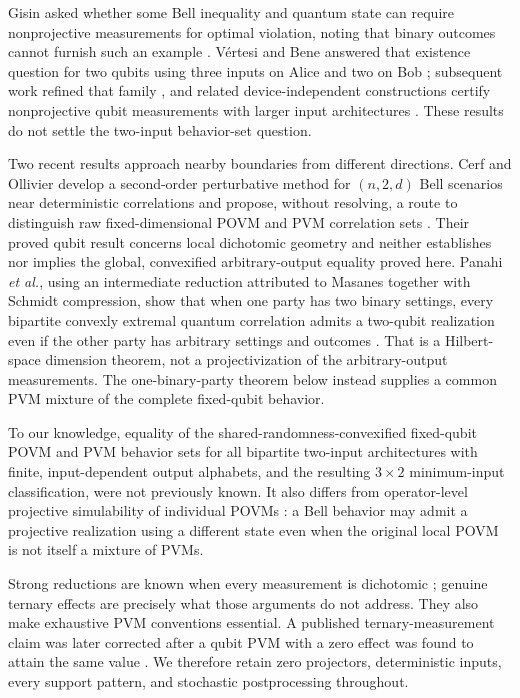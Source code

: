 \documentclass[11pt]{article}
\theoremstyle{definition}
\begin{document}
Gisin asked whether some Bell inequality and quantum state can require
nonprojective measurements for optimal violation, noting that binary outcomes
cannot furnish such an example \cite{gisin2007}. V\'ertesi and Bene answered
that existence question for two qubits using three inputs on Alice and two on Bob
\cite{vertesi2010}; subsequent work refined that family
\cite{barra2012}, and related device-independent constructions certify
nonprojective qubit measurements with larger input architectures
\cite{gomez2016}. These results do not settle the two-input behavior-set
question.

Two recent results approach nearby boundaries from different directions.
Cerf and Ollivier develop a second-order perturbative method for
\((n,2,d)\) Bell scenarios near deterministic correlations and propose,
without resolving, a route to distinguish raw fixed-dimensional POVM and PVM
correlation sets \cite{cerf2026}. Their proved qubit result concerns local
dichotomic geometry and neither establishes nor implies the global,
convexified arbitrary-output equality proved here. Panahi \emph{et al.},
using an intermediate reduction attributed to Masanes together with Schmidt
compression, show that when one party has two binary settings, every
bipartite convexly extremal quantum correlation admits a two-qubit
realization even if the other party has arbitrary settings and outcomes
\cite{panahi2025}. That is a Hilbert-space dimension theorem, not a
projectivization of the arbitrary-output measurements. The
one-binary-party theorem below instead supplies a common PVM mixture of the
complete fixed-qubit behavior.

To our knowledge, equality of the shared-randomness-convexified fixed-qubit
POVM and PVM behavior sets for all bipartite two-input architectures with
finite, input-dependent output alphabets, and the resulting \(3\times2\)
minimum-input classification, were not previously known.
It also differs from operator-level projective simulability of individual
POVMs \cite{oszmaniec2017,guerini2017}: a Bell behavior may admit a projective
realization using a different state even when the original local POVM is not
itself a mixture of PVMs.

Strong reductions are known when every measurement is dichotomic
\cite{masanes2005,toner2006}; genuine ternary effects are precisely what those
arguments do not address. They also make exhaustive PVM conventions
essential. A published ternary-measurement claim was later corrected after a
qubit PVM with a zero effect was found to attain the same value
\cite{schwarz2016,schwarz2018corrigendum}. We therefore retain zero
projectors, deterministic inputs, every support pattern, and stochastic
postprocessing throughout.
\end{document}

